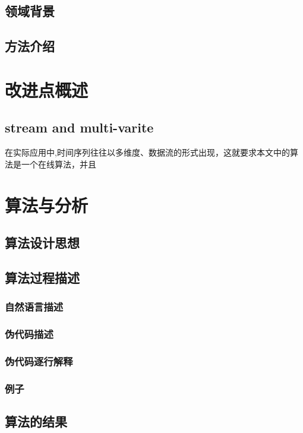 \documentclass[12pt,a4paper]{article}
\begin{document}
\subsection{领域背景}
\subsection{方法介绍}
\section{改进点概述}
\subsection{stream and multi-varite}
在实际应用中,时间序列往往以多维度、数据流的形式出现，这就要求本文中的算法是一个在线算法，并且
\section{算法与分析}
\subsection{算法设计思想}
\subsection{算法过程描述}
\subsubsection{自然语言描述}
\subsubsection{伪代码描述}
\subsubsection{伪代码逐行解释}
\subsubsection{例子}
\subsection{算法的结果}
\end{document}

